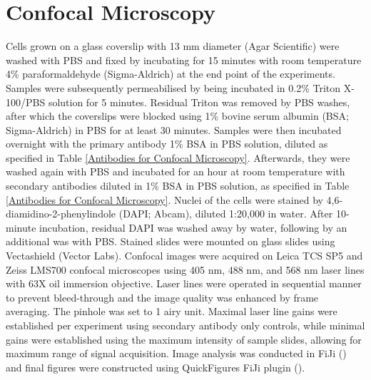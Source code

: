 \section{Confocal Microscopy} \label{Confocal Microscopy}
Cells grown on a glass coverslip with 13 mm diameter (Agar Scientific) were washed with PBS and fixed by incubating for 15 minutes with room temperature 4\% paraformaldehyde (Sigma-Aldrich) at the end point of the experiments. Samples were subsequently permeabilised by being incubated in 0.2\% Triton X-100/PBS solution for 5 minutes. Residual Triton was removed by PBS washes, after which the coverslips were blocked using 1\% bovine serum albumin (BSA; Sigma-Aldrich) in PBS for at least 30 minutes. Samples were then incubated overnight with the primary antibody 1\% BSA in PBS solution, diluted as specified in Table \ref{Antibodies for Confocal Microscopy}. Afterwards, they were washed again with PBS and incubated for an hour at room temperature with secondary antibodies diluted in 1\% BSA in PBS solution, as specified in Table \ref{Antibodies for Confocal Microscopy}. Nuclei of the cells were stained by 4,6-diamidino-2-phenylindole (DAPI; Abcam), diluted 1:20,000 in water. After 10-minute incubation, residual DAPI was washed away by water, following by an additional was with PBS. Stained slides were mounted on glass slides using Vectashield (Vector Labs). Confocal images were acquired on Leica TCS SP5 and Zeiss LMS700 confocal microscopes using 405 nm, 488 nm, and 568 nm laser lines with 63X oil immersion objective. Laser lines were operated in sequential manner to prevent bleed-through and the image quality was enhanced by frame averaging. The pinhole was set to 1 airy unit. Maximal laser line gains were established per experiment using secondary antibody only controls, while minimal gains were established using the maximum intensity of sample slides, allowing for maximum range of signal acquisition. Image analysis was conducted in FiJi (\cite{Schindelin2012Fiji:Analysis}) and final figures were constructed using QuickFigures FiJi plugin (\cite{Mazo2021QuickFigures:Figures}).


